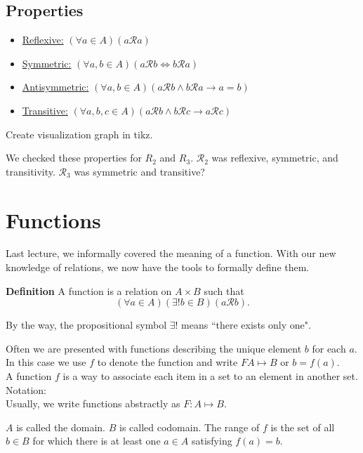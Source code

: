 \documentclass{article}
\begin{document}
\subsection*{Properties}
    
    \begin{itemize}
        \item \underline{Reflexive:} $(\forall a \in A)(a\mathcal{R}a)$
        \item \underline{Symmetric:} $(\forall a, b \in A)(a\mathcal{R}b \iff b\mathcal{R}a)$
        \item \underline{Antisymmetric:} $(\forall a, b\in A)(a\mathcal{R}b \wedge b\mathcal{R}a \rightarrow a=b)$
        \item \underline{Transitive:} $(\forall a, b, c\in A)(a\mathcal{R}b \wedge b\mathcal{R}c \rightarrow a\mathcal{R}c)$
    \end{itemize}
    Create visualization graph in tikz.
    
    We checked these properties for $R_{2}$ and $R_{3}$. $\mathcal{R}_{2}$ was reflexive, symmetric, and transitivity. $\mathcal{R}_{3}$ was symmetric and transitive?
    
\section*{Functions}
    Last lecture, we informally covered the meaning of a function. With our new knowledge of relations, we now have the tools to formally define them.
    
    \vspace{1.5mm}
    \textbf{Definition}
    A function is a relation on $A\times B$ such that 
    $$(\forall a \in A)(\exists! b \in B)(a\mathcal{R}b).$$
    
    By the way, the propositional symbol $\exists!$ means ``there exists only one".
    
    Often we are presented with functions describing the unique element $b$ for each $a$. In this case we use $f$ to denote the function and write $F A \mapsto B$ or $b=f(a)$. \\
    
    A function $f$ is a way to associate each item in a set to an element in another set. \\
    
    
    Notation:\\
    Usually, we write functions abstractly as $F: A \mapsto B$.
    
    $A$ is called the domain. $B$ is called codomain. The range of $f$ is the set of all $b\in B$ for which there is at least one $a\in A$ satisfying $f(a)=b$. 
    
\end{document}

